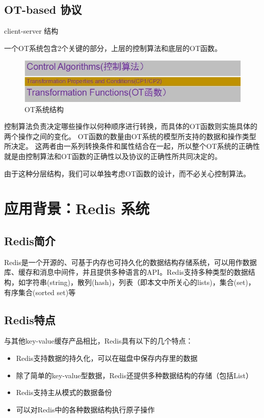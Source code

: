 \subsection{OT-based 协议}
client-server 结构

一个OT系统包含2个关键的部分，上层的控制算法和底层的OT函数。
\begin{figure}[H]
\centering
\includegraphics{figures/OT structure.jpg}
\caption{OT系统结构}
\end{figure}

控制算法负责决定哪些操作以何种顺序进行转换，而具体的OT函数则实施具体的两个操作之间的变化。
OT函数的数量由OT系统的模型所支持的数据和操作类型所决定。
这两者由一系列转换条件和属性结合在一起，所以整个OT系统的正确性就是由控制算法和OT函数的正确性以及协议的正确性所共同决定的。

由于这种分层结构，我们可以单独考虑OT函数的设计，而不必关心控制算法。
\cite{nichols1995high-latency}
\cite{sun2014exhaustive}
\section{应用背景：Redis 系统}
\subsection{Redis简介}
Redis是一个开源的、可基于内存也可持久化的数据结构存储系统，可以用作数据库、缓存和消息中间件，并且提供多种语言的API。Redis支持多种类型的数据结构，如字符串(string)，散列(hash)，列表（即本文中所关心的lists)，集合(set)，有序集合(sorted set)等
\subsection{Redis特点}
与其他key-value缓存产品相比，Redis具有以下的几个特点：
\begin{itemize}
\item Redis支持数据的持久化，可以在磁盘中保存内存里的数据
\item 除了简单的key-value型数据，Redis还提供多种数据结构的存储（包括List）
\item Redis支持主从模式的数据备份
\item 可以对Redis中的各种数据结构执行原子操作
\end{itemize}
